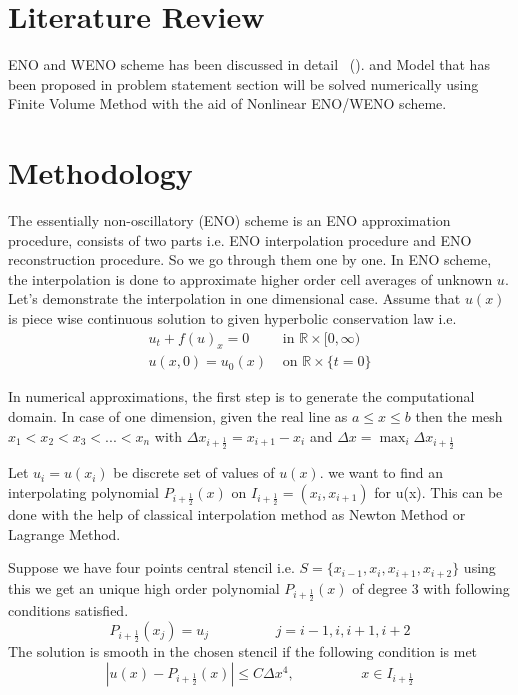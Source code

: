 \documentclass{article}
\begin{document}
\section{Literature Review}
ENO and WENO scheme has been discussed in detail ~(\cite{shu_2020}). and Model that has been proposed in problem statement section will be solved numerically using Finite Volume Method with the aid of Nonlinear ENO/WENO scheme.


\section{Methodology}
The essentially non-oscillatory (ENO) scheme is an ENO approximation procedure, consists of two parts i.e. ENO interpolation procedure  and ENO reconstruction procedure. So we go through them one by one. In ENO scheme, the interpolation is done to approximate higher order cell averages of unknown $u$. Let's demonstrate the interpolation in one dimensional case. Assume that $u(x)$ is piece wise continuous solution to given hyperbolic conservation law i.e.
\begin{align}
u_{t} + f(u)_{x} = 0  &\text{ in } \mathbb{R} \times [0,\infty)\\ 
u(x,0) = u_{0}(x) &\text{ on } \mathbb{R} \times \{t=0\}
\end{align}

\noindent In numerical approximations, the first step is to generate the computational domain. In case of one dimension, given the real line as $a\leq x \leq b$ then the  mesh $x_1<x_2<x_3<...<x_n$ with $\Delta x_{i+\frac{1}{2}} = x_{i+1} - x_i$ and $\Delta x = \max_i{\Delta x_{i+\frac{1}{2}}}$

\noindent Let $u_i = u(x_i)$ be discrete set of values of $u(x)$. we want to find an interpolating polynomial $P_{i+\frac{1}{2}}(x)$ on $I_{i+\frac{1}{2}} = (x_i,x_{i+1})$ for u(x). This can be done with the help of classical interpolation method as Newton Method or Lagrange Method. 


\noindent Suppose we have four points central stencil i.e. $S = \{x_{i-1},x_i,x_{i+1},x_{i+2}\}$ using this we get an unique high order polynomial $P_{i+\frac{1}{2}}(x)$ of degree 3 with following conditions satisfied.
\begin{equation}
    P_{i+\frac{1}{2}}(x_j) = u_j \hspace{2cm} j=i-1,i,i+1,i+2
\end{equation}
\noindent The solution is smooth in the chosen stencil if the following condition is met
\begin{equation} \label{HighOrderCondition}
    |u(x) - P_{i + \frac{1}{2}}(x)| \leq C \Delta x ^4, \hspace{2cm} x \in I_{i + \frac{1}{2}}
\end{equation}
\end{document}
